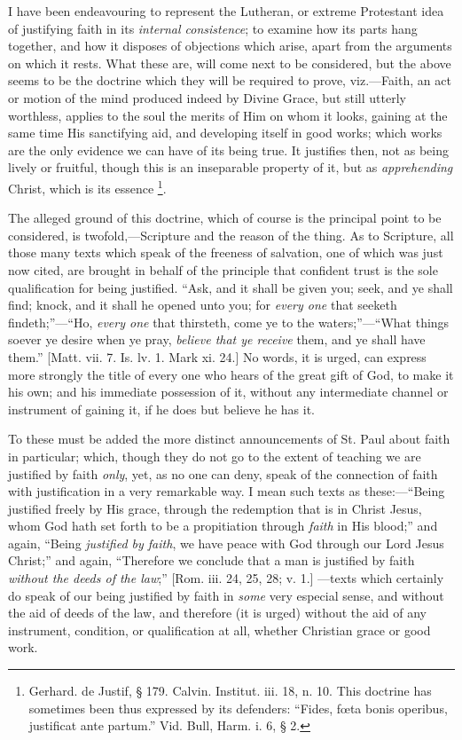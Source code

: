 I have been endeavouring to represent the Lutheran, or extreme
Protestant idea of justifying faith in its \emph{internal consistence};
to examine how its parts hang together, and how it disposes of
objections which arise, apart from the arguments on which it
rests. What these are, will come next to be considered, but the above
seems to be the doctrine which they will be required to prove, viz.—Faith,
an act or motion of the mind produced indeed by Divine Grace, but
still utterly worthless, applies to the soul the merits of Him on whom
it looks, gaining at the same time His sanctifying aid, and developing
itself in good works; which works are the only evidence we can have of
its being true. It justifies then, not as being lively or fruitful,
though this is an inseparable property of it, but as \emph{apprehending}
Christ, which is its essence \footnote{Gerhard. de
Justif, § 179. Calvin. Institut. iii. 18, n. 10. This doctrine has
sometimes been thus expressed by its defenders: ``Fides, fœta
bonis operibus, justificat ante partum.'' Vid. Bull, Harm. i. 6, § 2.}.

The alleged ground of this doctrine, which of course is the
principal point to be considered, is twofold,—Scripture and the
reason of the thing. As to Scripture, all those many texts which speak
of the freeness of salvation, one of which was just now cited, are
brought in behalf of the principle that confident trust is the sole
qualification for being justified. ``Ask, and it shall be given
you; seek, and ye shall find; knock, and it shall he opened unto you;
for \emph{every one} that seeketh findeth;''—``Ho, \emph{every
one} that thirsteth, come ye to the waters;''—``What
things soever ye desire when ye pray, \emph{believe that ye receive}
them, and ye shall have them.'' [Matt. vii. 7. Is. lv. 1. Mark xi.
24.] No words, it is urged, can express more strongly the title of
every one who hears of the great gift of God, to make it his own; and
his immediate possession of it, without any intermediate channel
or instrument of gaining it, if he does but believe he has it.

To these must be added the more distinct announcements of St. Paul
about faith in particular; which, though they do not go to the extent
of teaching we are justified by faith \emph{only}, yet, as no one can
deny, speak of the connection of faith with justification in a very
remarkable way. I mean such texts as these:—``Being justified
freely by His grace, through the redemption that is in Christ Jesus,
whom God hath set forth to be a propitiation through \emph{faith} in
His blood;'' and again, ``Being \emph{justified by faith}, we
have peace with God through our Lord Jesus Christ;'' and again,
``Therefore we conclude that a man is justified by faith \emph{without
the deeds of the law};'' [Rom. iii. 24, 25, 28; v. 1.] —texts
which certainly do speak of our being justified by faith in \emph{some}
very especial sense, and without the aid of deeds of the law, and
therefore (it is urged) without the aid of any instrument, condition,
or qualification at all, whether Christian grace or good work.


